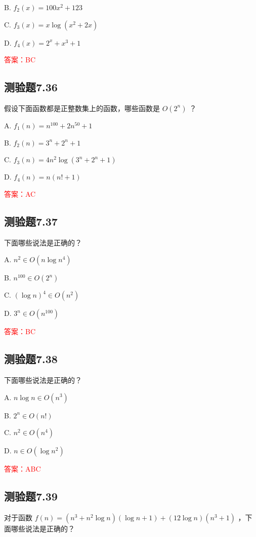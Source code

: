 \documentclass[UTF8, heading=true]{ctexart}
\begin{document}
B. $f_2(x)=100 x^2+123$


C. $f_3(x)=x \log \left(x^2+2 x\right)$

D. $f_4(x)=2^x+x^3+1$

\textcolor{red}{答案：BC}

\subsection{测验题7.36}

假设下面函数都是正整数集上的函数，哪些函数是 $O\left(2^n\right)$ ？

A. $f_1(n)=n^{100}+2 n^{50}+1$

B. $f_2(n)=3^n+2^n+1$

C. $f_3(n)=4 n^2 \log \left(3^n+2^n+1\right)$

D. $f_4(n)=n(n!+1)$

\textcolor{red}{答案：AC}


\subsection{测验题7.37}

下面哪些说法是正确的？

A. $ n^2 \in O\left(n \log n^4\right)$

B. $ n^{100} \in O\left(2^n\right)$

C. $(\log n)^4 \in O\left(n^2\right)$

D. $ 3^n \in O\left(n^{100}\right)$


\textcolor{red}{答案：BC}

\subsection{测验题7.38}

下面哪些说法是正确的？

A. $ n \log n \in O\left(n^3\right)$

B. $2^n \in O(n!)$

C. $n^2 \in O\left(n^4\right)$

D. $ n \in O\left(\log n^2\right)$

\textcolor{red}{答案：ABC}


\subsection{测验题7.39}

对于函数 $f(n)=\left(n^3+n^2 \log n\right)(\log n+1)+(12 \log n)\left(n^3+1\right)$ ，下面哪些说法是正确的？
\end{document}
